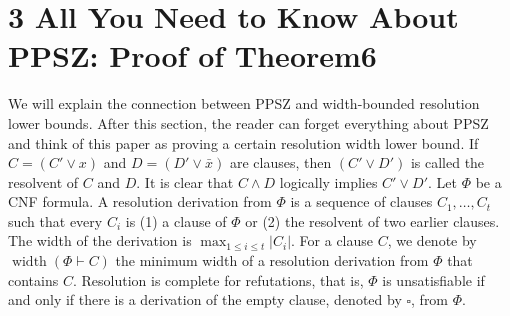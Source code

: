 \documentclass[10pt,a4paper]{article}
\begin{document}
\section*{3 All You Need to Know About PPSZ: Proof of Theorem6}
We will explain the connection between PPSZ and width-bounded resolution lower bounds. After this section, the reader can forget everything about PPSZ and think of this paper as proving a certain resolution width lower bound. If $C=(C'\vee x)$ and $D=(D'\vee\bar x)$ are clauses, then $(C'\vee D')$ is called the resolvent of $C$ and $D$. It is clear that $C\wedge D$ logically implies $C'\vee D'$. Let $\Phi$ be a CNF formula. A resolution derivation from $\Phi$ is a sequence of clauses $C_1,\ldots,C_t$ such that every $C_i$ is (1) a clause of $\Phi$ or (2) the resolvent of two earlier clauses. The width of the derivation is $\max_{1\le i\le t}|C_i|$. For a clause $C$, we denote by $\operatorname{width}(\Phi\vdash C)$ the minimum width of a resolution derivation from $\Phi$ that contains $C$. Resolution is complete for refutations, that is, $\Phi$ is unsatisfiable if and only if there is a derivation of the empty clause, denoted by $\square$, from $\Phi$.
\end{document}
